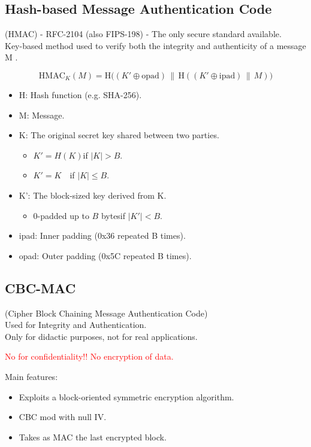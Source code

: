 \subsection{Hash-based Message Authentication Code}
\begin{center}
    (HMAC) - RFC-2104 (also FIPS-198) - The only secure standard available.
    \\ Key-based method used to verify both the integrity and authenticity of a message  M .
\end{center}

\[
\text{HMAC}_K(M) = \text{H}\big((K' \oplus \text{opad}) \, \| \, \text{H}((K' \oplus \text{ipad}) \, \| \, M)\big)
\]

\begin{itemize}
    \item H: Hash function (e.g. SHA-256).
    \item M: Message.
    \item K: The original secret key shared between two parties.
    \begin{itemize}
        \item $K' = H(K)$\quad if $|K| > B$.
        \item $K' = K$\quad\ \ \quad if $|K| \le B$.
    \end{itemize}
    \item K': The block-sized key derived from  K.
    \begin{itemize}
        \item 0-padded up to $B$ bytes\quad if $|K'| < B$.
    \end{itemize}
    \item ipad: Inner padding (0x36 repeated B times).
    \item opad: Outer padding (0x5C repeated B times).
\end{itemize}


\subsection{CBC-MAC}
\begin{center}
    (Cipher Block Chaining Message Authentication Code)
    \\ Used for Integrity and Authentication.
    \\ Only for didactic purposes, not for real applications.
\end{center}
\textcolor{Red}{No for confidentiality!! No encryption of data.}

Main features:
\begin{itemize}
    \item Exploits a block-oriented symmetric encryption algorithm.
    \item CBC mod with null IV.
    \item Takes as MAC the last encrypted block.
\end{itemize}

